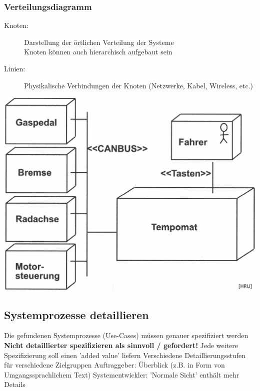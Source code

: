 \begin{minipage}[t]{0.5\columnwidth}
    \raggedright

    \subsubsection{Verteilungsdiagramm}
    
    \begin{description}
        \item[Knoten:] Darstellung der örtlichen Verteilung der Systeme \\
            Knoten können auch hierarchisch aufgebaut sein
        \item[Linien:] Physikalische Verbindungen der Knoten (Netzwerke, Kabel, Wireless, etc.)
    \end{description}
\end{minipage}
\hfill
\begin{minipage}[t]{0.46\columnwidth}
    
    \includegraphics[width=\columnwidth]{images/verteilungsdiagramm_tempomat.png}
\end{minipage}


\subsection{Systemprozesse detaillieren}

\begin{outline}
    \1 Die gefundenen Systemprozesse (Use-Cases) müssen genauer spezifiziert werden
        \2 \textbf{Nicht detaillierter spezifizieren als sinnvoll / gefordert!}
        \2 Jede weitere Spezifizierung soll einen 'added value' liefern
    \1 Verschiedene Detaillierungsstufen für verschiedene Zielgruppen
        \2 Auftraggeber: Überblick (z.B. in Form von Umgangssprachlichem Text)
        \2 Systementwickler: 'Normale Sicht' enthält mehr Details
\end{outline}


